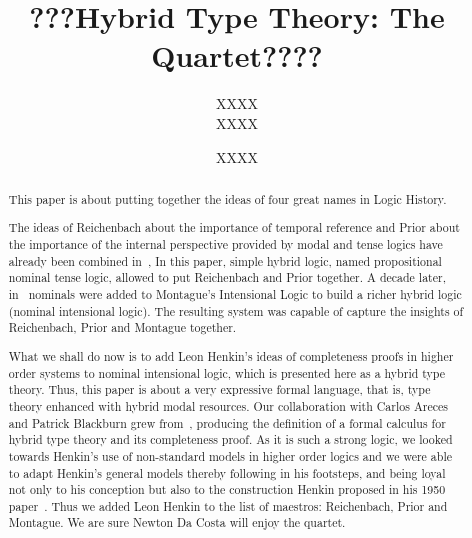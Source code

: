 \documentclass{article}
\begin{document}
\title{???Hybrid Type Theory: The Quartet????}
\author{XXXX \\
XXXX}
\date{XXXX}
\maketitle

\begin{abstract}
This paper is about putting together the ideas of four great names in Logic
History. \ 

The ideas of Reichenbach about the importance of temporal reference and
Prior about the importance of the internal perspective provided by modal and
tense logics have already been combined in~\cite{Blackburn1994}, In this
paper, simple hybrid logic, named propositional nominal tense logic, allowed
to put Reichenbach and Prior together. A decade later, in~\cite{ArecesBlackburn2005} nominals were added to Montague's Intensional Logic to build
a richer hybrid logic (nominal intensional logic). The resulting system was
capable of capture the insights of Reichenbach, Prior and Montague together.

What we shall do now is to add Leon Henkin's ideas of completeness proofs in
higher order systems to nominal intensional logic, which is presented here
as a hybrid type theory. Thus, this paper is about a very expressive formal
language, that is, type theory enhanced with hybrid modal resources. Our
collaboration with Carlos Areces and Patrick Blackburn grew 
from~\cite{ArecesBlackburn2005}, producing the definition of a formal calculus for
hybrid type theory and its completeness proof. As it is such a strong logic,
we looked towards Henkin's use of non-standard models in higher order logics
and we were able to adapt Henkin's general models thereby following in his
footsteps, and being loyal not only to his conception but also to the
construction Henkin proposed in his 1950 paper~\cite{Henkin1950}. Thus we
added Leon Henkin to the list of maestros: Reichenbach, Prior and Montague.
We are sure Newton Da Costa will enjoy the quartet.
\end{abstract}

\begin{small}
\tableofcontents
\end{small}








 

\end{document}
